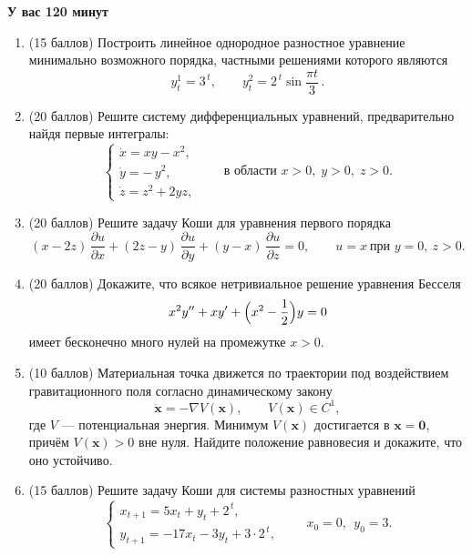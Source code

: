 \documentclass[12pt]{article}
\begin{document}
\begin{center}
\textbf{У вас 120 минут}
\end{center}

\begin{enumerate}
\item (15 баллов) Построить линейное однородное разностное уравнение
минимально возможного порядка, частными решениями которого являются
\[
y^{1}_{t}=3^{\,t},\qquad
y^{2}_{t}=2^{\,t}\sin\!\frac{\pi t}{3}\, .
\]

\item (20 баллов) Решите систему дифференциальных уравнений,
предварительно найдя первые интегралы:
\[
\begin{cases}
\dot x = x y - x^{2},\\[2pt]
\dot y = -\,y^{2},\\[2pt]
\dot z = z^{2} + 2yz,
\end{cases}
\qquad \text{в области } x>0,\; y>0,\; z>0 .
\]

\item (20 баллов) Решите задачу Коши для уравнения первого порядка
\[
(x-2z)\,\frac{\partial u}{\partial x}
+ (2z-y)\,\frac{\partial u}{\partial y}
+ (y-x)\,\frac{\partial u}{\partial z}=0,
\qquad
u=x \ \text{при } y=0,\ z>0 .
\]

\item (20 баллов) Докажите, что всякое нетривиальное решение уравнения Бесселя
\[
x^{2}y''+x y'+\Bigl(x^{2}-\frac12\Bigr)y=0
\]
имеет бесконечно много нулей на промежутке $x>0$.

\item (10 баллов) Материальная точка движется по траектории под воздействием
гравитационного поля согласно динамическому закону
\[
\ddot{\mathbf x}=-\nabla V(\mathbf x),
\qquad V(\mathbf x)\in C^{1},
\]
где $V$ — потенциальная энергия. Минимум $V(\mathbf x)$ достигается в
$\mathbf x=\mathbf 0$, причём $V(\mathbf x)>0$ вне нуля.
Найдите положение равновесия и докажите, что оно устойчиво.

\item (15 баллов) Решите задачу Коши для системы разностных уравнений
\[
\begin{cases}
x_{t+1}=5x_{t}+y_{t}+2^{\,t},\\[2pt]
y_{t+1}=-17x_{t}-3y_{t}+3\cdot 2^{\,t},
\end{cases}
\qquad
x_{0}=0,\ \ y_{0}=3.
\]
\end{enumerate}
\end{document}
